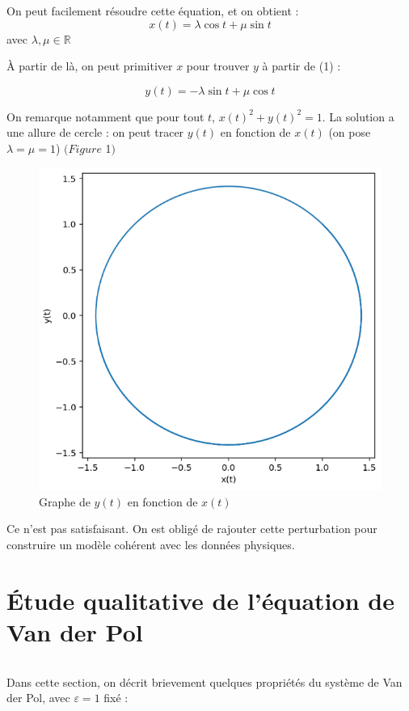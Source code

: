 \documentclass{article}
\begin{document}
On peut facilement résoudre cette équation, et on obtient :
\[ x(t) = \lambda \cos t + \mu \sin t\]
avec $\lambda ,\mu \in \mathbb{R}$

À partir de là, on peut primitiver $x$ pour trouver $y$ à partir de (1) :

\[ y(t) = -\lambda \sin t + \mu \cos t\]

On remarque notamment que pour tout $t$,  $x(t)^2 + y(t)^2 = 1$. La solution a une allure de cercle : on peut tracer $y(t)$ en fonction de $x(t)$ (on pose $\lambda = \mu = 1$)  $(Figure$ 1$)$ 

\begin{figure}[!h]
\centering
\includegraphics[scale=0.5]{../images/plot_circ.png}
\caption{Graphe de $y(t)$ en fonction de $x(t)$}
\end{figure}

Ce n'est pas satisfaisant. On est obligé de rajouter cette perturbation pour construire un modèle cohérent avec les données physiques.

\section{Étude qualitative de l’équation de Van der Pol}

\[\]

Dans cette section, on décrit brievement quelques propriétés du système de Van der Pol, avec $\varepsilon = 1$ fixé :
\end{document}
